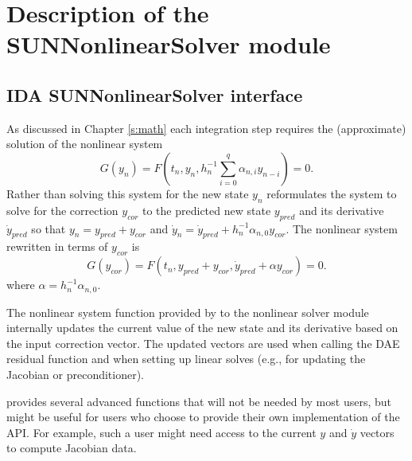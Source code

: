 \chapter{Description of the SUNNonlinearSolver module}\label{c:sunnonlinsol}


\section{IDA SUNNonlinearSolver interface}
\label{s:sunnonlinsol_interface}

As discussed in Chapter \ref{s:math} each integration step requires the
(approximate) solution of the nonlinear system
\begin{equation}
  G(y_n) = F\left(t_n, y_n, h_{n}^{-1}\sum_{i=0}^{q}\alpha_{n,i}y_{n-i}\right) = 0.
\end{equation}
Rather than solving this system for the new state $y_n$ {\ida} reformulates the
system to solve for the correction $y_{cor}$ to the predicted new state $y_{pred}$
and its derivative $\dot{y}_{pred}$ so that $y_n = y_{pred} + y_{cor}$ and
$\dot{y}_n = \dot{y}_{pred} + h_{n}^{-1} \alpha_{n,0} y_{cor}$. The nonlinear
system rewritten in terms of $y_{cor}$ is
\begin{equation} \label{eq:res_corrector}
  G(y_{cor}) = F\left(t_n, y_{pred}+y_{cor},
  \dot{y}_{pred} + \alpha y_{cor}\right) = 0.
\end{equation}
where $\alpha = h_{n}^{-1} \alpha_{n,0}$.

The nonlinear system function provided by {\ida} to the nonlinear solver module
internally updates the current value of the new state and its derivative based
on the input correction vector. The updated vectors are used when calling the
DAE residual function and when setting up linear solves (e.g., for updating the
Jacobian or preconditioner).

{\ida} provides several advanced functions that will not be needed by most users,
but might be useful for users who choose to provide their own implementation of
the  API. For example, such a user might need access to
the current $y$ and $\dot{y}$ vectors to compute Jacobian data.


